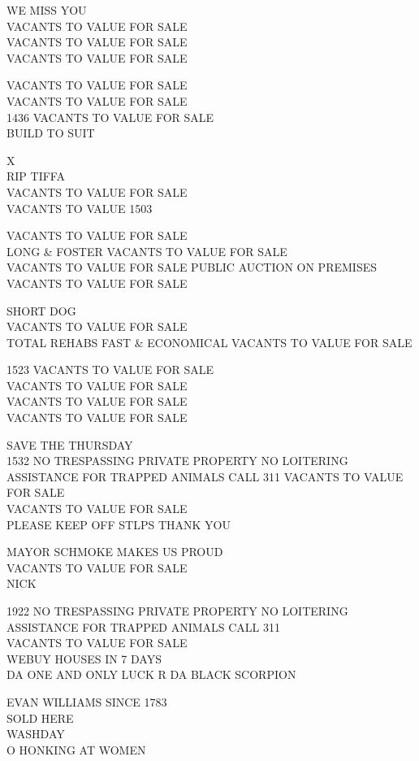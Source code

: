 \documentclass[10pt,letterpaper]{article}
\begin{document}
WE MISS YOU\\
VACANTS TO VALUE FOR SALE\\
VACANTS TO VALUE FOR SALE\\
VACANTS TO VALUE FOR SALE

VACANTS TO VALUE FOR SALE\\
VACANTS TO VALUE FOR SALE\\
1436 VACANTS TO VALUE FOR SALE\\
BUILD TO SUIT

X\\
RIP TIFFA\\
VACANTS TO VALUE FOR SALE\\
VACANTS TO VALUE 1503

VACANTS TO VALUE FOR SALE\\
LONG \& FOSTER VACANTS TO VALUE FOR SALE\\
VACANTS TO VALUE FOR SALE PUBLIC AUCTION ON PREMISES\\
VACANTS TO VALUE FOR SALE

SHORT DOG\\
VACANTS TO VALUE FOR SALE\\
TOTAL REHABS FAST \& ECONOMICAL VACANTS TO VALUE FOR SALE

1523 VACANTS TO VALUE FOR SALE\\
VACANTS TO VALUE FOR SALE\\
VACANTS TO VALUE FOR SALE\\
VACANTS TO VALUE FOR SALE

SAVE THE THURSDAY\\
1532 NO TRESPASSING PRIVATE PROPERTY NO LOITERING ASSISTANCE FOR TRAPPED ANIMALS CALL 311 VACANTS TO VALUE FOR SALE\\
VACANTS TO VALUE FOR SALE\\
PLEASE KEEP OFF STLPS THANK YOU

MAYOR SCHMOKE MAKES US PROUD\\
VACANTS TO VALUE FOR SALE\\
NICK

1922 NO TRESPASSING PRIVATE PROPERTY NO LOITERING ASSISTANCE FOR TRAPPED ANIMALS CALL 311\\
VACANTS TO VALUE FOR SALE\\
WEBUY HOUSES IN 7 DAYS\\
DA ONE AND ONLY LUCK R DA BLACK SCORPION

EVAN WILLIAMS SINCE 1783\\
SOLD HERE\\
WASHDAY\\
O HONKING AT WOMEN
\end{document}
